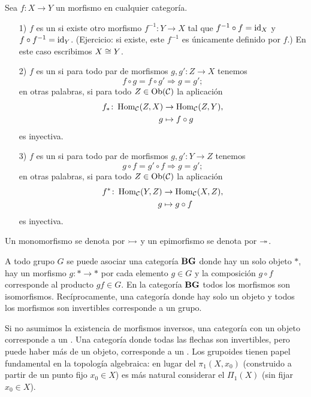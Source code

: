 \documentclass{article}
\numberwithin{equation}{section}
\theoremstyle{definition}
\begin{document}
\begin{definicion}
  \label{definicion:iso-mono-epi}
  Sea $f\colon X\to Y$ un morfismo en cualquier categoría.

  \begin{enumerate}
  \item[1)] $f$ es un  si existe otro morfismo
    $f^{-1}\colon Y\to X$ tal que $f^{-1}\circ f = \mathrm{id}_{X}$ y
    $f\circ f^{-1} = \mathrm{id}_{Y}$. (Ejercicio: si existe, este $f^{-1}$ es únicamente
    definido por $f$.) En este caso escribimos $X\cong Y$.

  \item[2)] $f$ es un  si para todo par de morfismos
    $g,g'\colon Z \to X$ tenemos
    $$f\circ g = f\circ g' \Rightarrow g = g';$$
    en otras palabras, si para todo $Z\in \operatorname{Ob}(\mathcal{C})$ la aplicación
    \begin{align*}
      f_*\colon \operatorname{Hom}_\mathcal{C} (Z,X) & \to \operatorname{Hom}_\mathcal{C} (Z,Y),\\
      g & \mapsto f\circ g
    \end{align*}
    es inyectiva.

  \item[3)] $f$ es un  si para todo par de morfismos
    $g,g'\colon Y\to Z$ tenemos
    $$g\circ f = g'\circ f \Rightarrow g = g';$$
    en otras palabras, si para todo $Z\in \operatorname{Ob}(\mathcal{C})$ la aplicación
    \begin{align*}
      f^*\colon \operatorname{Hom}_\mathcal{C} (Y,Z) & \to \operatorname{Hom}_\mathcal{C} (X,Z),\\
      g & \mapsto g\circ f
    \end{align*}
    es inyectiva.
  \end{enumerate}

  Un monomorfismo se denota por $\rightarrowtail$ y un epimorfismo se denota por $\twoheadrightarrow$.
\end{definicion}

\begin{ejemplo}
  \label{ejemplo:grupos-como-categorias}
  A todo grupo $G$ se puede asociar una categoría $\text{\bf BG}$ donde hay un solo
  objeto $\ast$, hay un morfismo $g\colon \ast\to\ast$ por cada elemento
  $g\in G$ y la composición $g\circ f$ corresponde al producto $gf\in G$. En la
  categoría $\text{\bf BG}$ todos los morfismos son isomorfismos. Recíprocamente,
  una categoría donde hay solo un objeto y todos los morfismos son invertibles
  corresponde a un grupo.

  Si no asumimos la existencia de morfismos inversos, una categoría con un
  objeto corresponde a un . Una categoría donde todas las flechas
  son invertibles, pero puede haber más de un objeto, corresponde a un
  . Los grupoides tienen papel fundamental en la topología
  algebraica: en lugar del  $\pi_1 (X,x_0)$ (construido
  a partir de un punto fijo $x_0\in X$) es más natural considerar el
   $\Pi_1 (X)$ (sin fijar $x_0\in X$).
\end{ejemplo}
\end{document}
